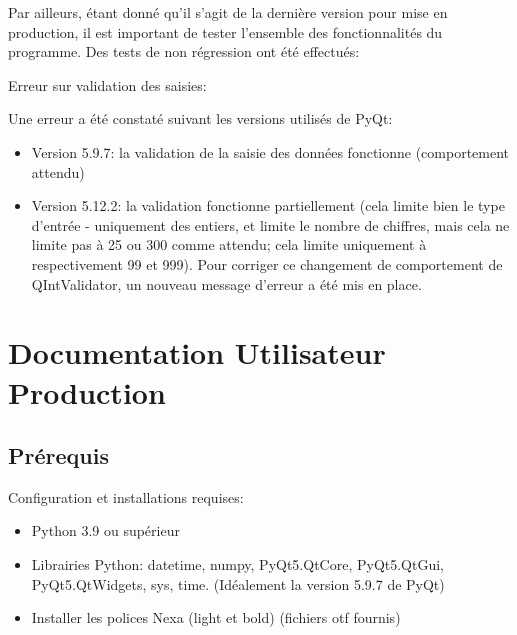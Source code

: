 \bigskip

Par ailleurs, étant donné qu’il s’agit de la dernière version pour mise en production,
il est important de tester l’ensemble des fonctionnalités du programme. Des tests de non régression
ont été effectués:


\bigskip
Erreur sur validation des saisies:

Une erreur a été constaté suivant les versions utilisés de PyQt:
\begin{itemize}
    \item Version 5.9.7: la validation de la saisie des données fonctionne (comportement attendu)
    \item Version 5.12.2: la validation fonctionne partiellement (cela limite bien le type d'entrée - uniquement des entiers, et limite le nombre de chiffres, mais cela ne limite pas à 25 ou 300 comme attendu; cela limite uniquement à respectivement 99 et 999). Pour corriger ce changement de comportement de QIntValidator, un nouveau message d’erreur a été mis en place.
\end{itemize}

\section{Documentation Utilisateur Production}

\subsection{Prérequis}

Configuration et installations requises:

\begin{itemize}
    \item Python 3.9 ou supérieur
    \item Librairies Python: datetime, numpy, PyQt5.QtCore, PyQt5.QtGui, PyQt5.QtWidgets, sys, time.
          (Idéalement la version 5.9.7 de PyQt)
    \item Installer les polices Nexa (light et bold) (fichiers otf fournis)
\end{itemize}
